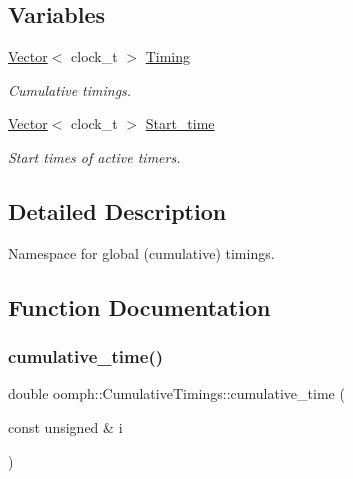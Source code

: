 \subsection*{Variables}
\begin{DoxyCompactItemize}
\item 
\hyperlink{classoomph_1_1Vector}{Vector}$<$ clock\+\_\+t $>$ \hyperlink{namespaceoomph_1_1CumulativeTimings_aaa3cc3208ed1f841dd3ff0ddf346a067}{Timing}
\begin{DoxyCompactList}\small\item\em Cumulative timings. \end{DoxyCompactList}\item 
\hyperlink{classoomph_1_1Vector}{Vector}$<$ clock\+\_\+t $>$ \hyperlink{namespaceoomph_1_1CumulativeTimings_ad9ef14aa764288369edd9265b61dc39c}{Start\+\_\+time}
\begin{DoxyCompactList}\small\item\em Start times of active timers. \end{DoxyCompactList}\end{DoxyCompactItemize}


\subsection{Detailed Description}
Namespace for global (cumulative) timings. 

\subsection{Function Documentation}
\mbox{\label{namespaceoomph_1_1CumulativeTimings_a33447b850b466ef8247b14af6623e07f}} 
\subsubsection{\texorpdfstring{cumulative\+\_\+time()}{cumulative\_time()}}
{\footnotesize\ttfamily double oomph\+::\+Cumulative\+Timings\+::cumulative\+\_\+time (\begin{DoxyParamCaption}\item[{const unsigned \&}]{i }\end{DoxyParamCaption})}




